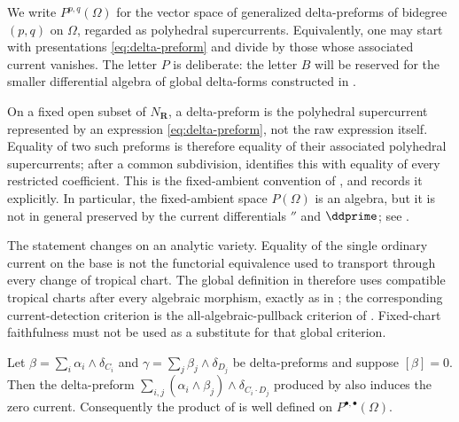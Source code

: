 \begin{definition}
\label{def:ch18-delta-form-euclidean}
We write $P^{p,q}(\Omega)$ for the vector space of generalized
delta-preforms of bidegree $(p,q)$ on $\Omega$, regarded as polyhedral
supercurrents.  Equivalently, one may start with presentations
\eqref{eq:delta-preform} and divide by those whose associated current
vanishes.  The letter $P$ is deliberate: the letter $B$ will be reserved
for the smaller differential algebra of global delta-forms constructed in
.
\end{definition}

\begin{remark}
\label{rem:ch18-normalization-choice}
On a fixed open subset of $N_{\mathbf R}$, a delta-preform is the
polyhedral supercurrent represented by an expression
\eqref{eq:delta-preform}, not the raw expression itself.  Equality of two
such preforms is therefore equality of their associated polyhedral
supercurrents; after a common subdivision,
 identifies this with equality of every
restricted coefficient.  This is the fixed-ambient convention of
\cite[Definition~2.9 and Remark~2.11]{GK17}, and
 records it explicitly.  In particular,
the fixed-ambient space $P(\Omega)$ is an algebra, but it is not in general
preserved by the current differentials $\dprime$ and $\ddprime$; see
.

The statement changes on an analytic variety.  Equality of the single
ordinary current on the base is not the functorial equivalence used to
transport through every change of tropical chart.  The global definition in
 therefore uses compatible tropical charts
after every algebraic morphism, exactly as in \cite[\S4]{GK17}; the corresponding
current-detection criterion is the all-algebraic-pullback criterion of
\cite[Proposition~6.8]{GK17}.  Fixed-chart faithfulness must not be used as
a substitute for that global criterion.
\end{remark}

\begin{proposition}
\label{prop:ch18-product-descends}
Let $\beta=\sum_i\alpha_i\wedge\delta_{C_i}$ and
$\gamma=\sum_j\beta_j\wedge\delta_{D_j}$ be delta-preforms and suppose
$[\beta]=0$.  Then the delta-preform
$\sum_{i,j}(\alpha_i\wedge\beta_j)\wedge\delta_{C_i\cdot D_j}$ produced by
 also induces the zero current.
Consequently the product of  is well defined
on $P^{\bullet,\bullet}(\Omega)$.
\end{proposition}

